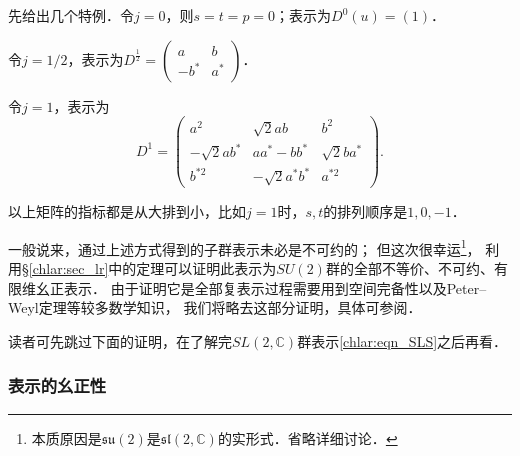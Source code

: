 先给出几个特例．令$j=0$，则$s=t=p=0$；表示为$D^{0}(u)=(1)$．

令$j=1/2$，表示为$D^{\frac{1}{2}}=\begin{pmatrix}a & b \\ -b^* & a^* \end{pmatrix}$．

令$j=1$，表示为
\begin{equation*}
	D^{1}=\begin{pmatrix}    a^2 & \sqrt{2} a b & b^2 \\
		-\sqrt{2} a b^* & a a^*-b b^* & \sqrt{2} b a^* \\
		b^{*2} & -\sqrt{2} a^* b^* & a^{*2}
	\end{pmatrix} .
\end{equation*}

以上矩阵的指标都是从大排到小，比如$j=1$时，$s,t$的排列顺序是$1,0,-1$．







一般说来，通过上述方式得到的子群表示未必是不可约的；
但这次很幸运{\footnote{本质原因是$\mathfrak{su}(2)$是$\mathfrak{sl}(2,\mathbb{C})$的实形式．省略详细讨论．}}，
利用\S\ref{chlar:sec_lr}中的定理可以证明此表示为$SU(2)$群的全部不等价、不可约、有限维幺正表示．
由于证明它是全部复表示过程需要用到空间完备性以及Peter--Weyl定理等较多数学知识，
我们将略去这部分证明，具体可参阅\parencite[\S 6.6.4]{qiuws-2011}．

读者可先跳过下面的证明，在了解完$SL(2,\mathbb{C})$群表示\eqref{chlar:eqn_SLS}之后再看．

\subsubsection{表示的幺正性}

